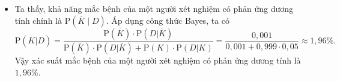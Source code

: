 \begin{bt}
{\begin{itemize}
\begin{center}
			\end{center}
			\item Ta thấy, khả năng mắc bệnh của một người xét nghiệm có phản ứng dương tính chính là $\mathrm{P}(\overline{K} \mid D)$. Áp dụng công thức Bayes, ta có
			$$
			\mathrm{P}(\overline{K}|D)=\dfrac{\mathrm{P}(\overline{K}) \cdot \mathrm{P}(D| \overline{K})}{\mathrm{P}(\overline{K}) \cdot \mathrm{P}(D| \overline{K})+\mathrm{P}(K) \cdot \mathrm{P}(D| K)}=\dfrac{0{,}001}{0{,}001+0{,}999 \cdot 0{,}05} \approx 1{,}96 \% .
			$$			
			Vậy xác suất mắc bệnh của một người xét nghiệm có phản ứng dương tính là $1{,}96\%$.
		\end{itemize}		
	}
\end{bt}

